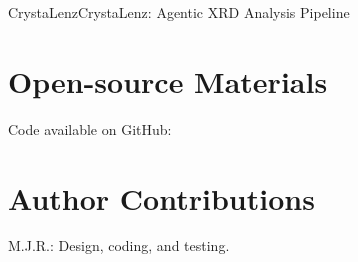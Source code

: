 \begin{teamsubmission}{CrystaLenz}{CrystaLenz: Agentic XRD Analysis Pipeline}
\section*{Open-source Materials}
Code available on GitHub: 

\section*{Author Contributions}
M.J.R.: Design, coding, and testing.

\end{teamsubmission}




